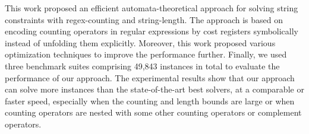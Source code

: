 
This work proposed an efficient automata-theoretical approach for solving string constraints with regex-counting and string-length. The approach is based on encoding counting operators in regular expressions by cost registers symbolically instead of unfolding them explicitly. Moreover, this work proposed various optimization techniques to improve the performance further. Finally, we used three benchmark suites comprising 49,843 instances in total to evaluate the performance of our approach. The experimental results show that our approach can solve more instances than the state-of-the-art best solvers, at a comparable or faster speed, especially when the counting and length bounds are large or when counting operators are nested with some other counting operators or complement operators. 
